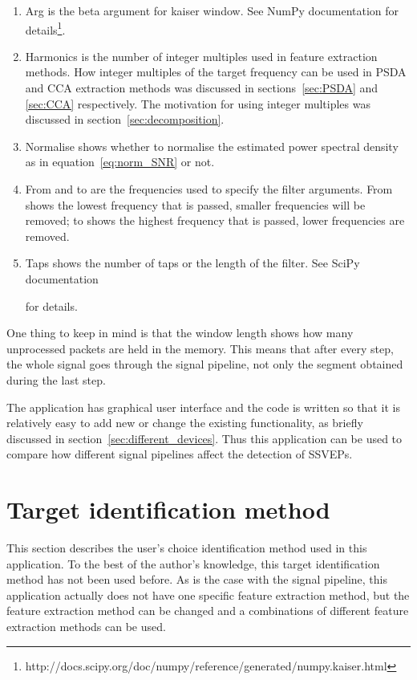 \begin{enumerate}
	\item Arg is the beta argument for kaiser window. See NumPy documentation for details\footnote{http://docs.scipy.org/doc/numpy/reference/generated/numpy.kaiser.html}.
	\item Harmonics is the number of integer multiples used in \gls{feature extraction} methods. How integer multiples of the \gls{target} frequency can be used in \gls{PSDA} and \gls{CCA} extraction methods was discussed in sections~\ref{sec:PSDA} and \ref{sec:CCA} respectively. The motivation for using integer multiples was discussed in section~\ref{sec:decomposition}.
	\item Normalise shows whether to normalise the estimated \gls{power spectral density} as in equation~\ref{eq:norm_SNR} or not.
	\item From and to are the frequencies used to specify the filter arguments. From shows the lowest frequency that is passed, smaller frequencies will be removed; to shows the highest frequency that is passed, lower frequencies are removed.
	\item Taps shows the number of taps or the length of the filter. See SciPy documentation\addtocounter{footnote}{-2}\footnotemark\addtocounter{footnote}{1} for details.
\end{enumerate}

One thing to keep in mind is that the window length shows how many unprocessed packets are held in the memory. This means that after every step, the whole signal goes through the signal pipeline, not only the segment obtained during the last step.

The application has graphical user interface and the code is written so that it is relatively easy to add new or change the existing functionality, as briefly discussed in section~\ref{sec:different_devices}. Thus this application can be used to compare how different signal pipelines affect the detection of \glspl{SSVEP}.

\section{Target identification method}
\label{sec:identification}

This section describes the user's choice identification method used in this application. To the best of the author's knowledge, this \gls{target} identification method has not been used before. As is the case with the signal pipeline, this application actually does not have one specific \gls{feature extraction} method, but the \gls{feature extraction} method can be changed and a combinations of different \gls{feature extraction} methods can be used.

